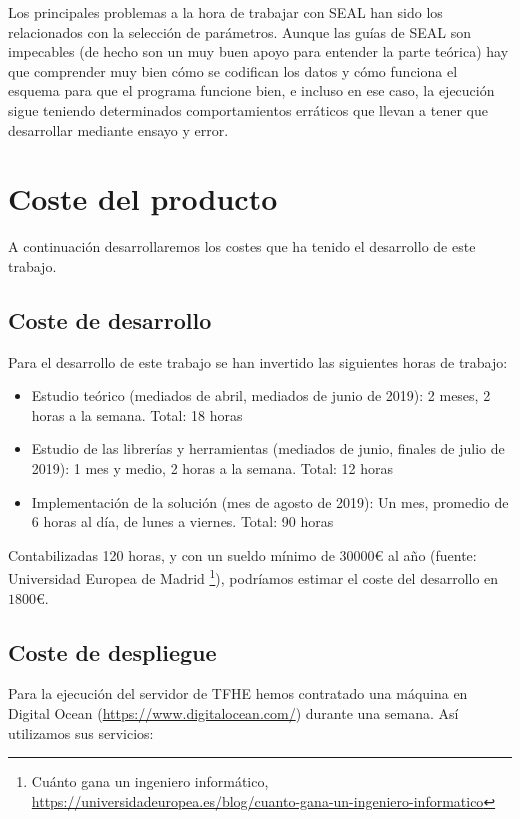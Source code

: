 Los principales problemas a la hora de trabajar con SEAL han sido los relacionados con la selección de parámetros. Aunque las guías de SEAL son impecables (de hecho son un muy buen apoyo para entender la parte teórica) hay que comprender muy bien cómo se codifican los datos y cómo funciona el esquema para que el programa funcione bien, e incluso en ese caso, la ejecución sigue teniendo determinados comportamientos erráticos que llevan a tener que desarrollar mediante ensayo y error.

\section{Coste del producto}

A continuación desarrollaremos los costes que ha tenido el desarrollo de este trabajo.

\subsection{Coste de desarrollo}

Para el desarrollo de este trabajo se han invertido las siguientes horas de trabajo:

\begin{itemize}
    \item Estudio teórico (mediados de abril, mediados de junio de 2019): 2 meses, 2 horas a la semana. Total: 18 horas
    \item Estudio de las librerías y herramientas (mediados de junio, finales de julio de 2019): 1 mes y medio, 2 horas a la semana. Total: 12 horas
    \item Implementación de la solución (mes de agosto de 2019): Un mes, promedio de 6 horas al día, de lunes a viernes. Total: 90 horas
\end{itemize}

Contabilizadas 120 horas, y con un sueldo mínimo de $30000$\euro{} al año (fuente: Universidad Europea de Madrid \footnote{Cuánto gana un ingeniero informático, \url{https://universidadeuropea.es/blog/cuanto-gana-un-ingeniero-informatico}}), podríamos estimar el coste del desarrollo en $1800$\euro{}.

\subsection{Coste de despliegue}

Para la ejecución del servidor de TFHE hemos contratado una máquina en Digital Ocean (\url{https://www.digitalocean.com/}) durante una semana. Así utilizamos sus servicios:

